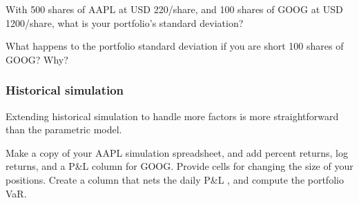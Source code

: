 \documentclass{report}
\numberwithin{problem}{chapter} %
\let\oldroblem\problem
\renewcommand{\problem}{ \oldroblem  \normalfont}
\newcommand{\pnl}{P\&L }
\begin{document}
\problem With 500 shares of AAPL at USD 220/share, and 100 shares of GOOG at USD 1200/share, what is your portfolio's standard deviation?

\problem What happens to the portfolio standard deviation if you are short 100 shares of GOOG? Why?

\subsubsection{Historical simulation}

Extending historical simulation to handle more factors is more straightforward than the parametric model.   

\problem Make a copy of your AAPL simulation spreadsheet, and add percent returns, log returns, and a \pnl column for GOOG. Provide cells for changing the size of your positions. Create a column that nets the daily \pnl, and compute the portfolio VaR. 
\end{document}
